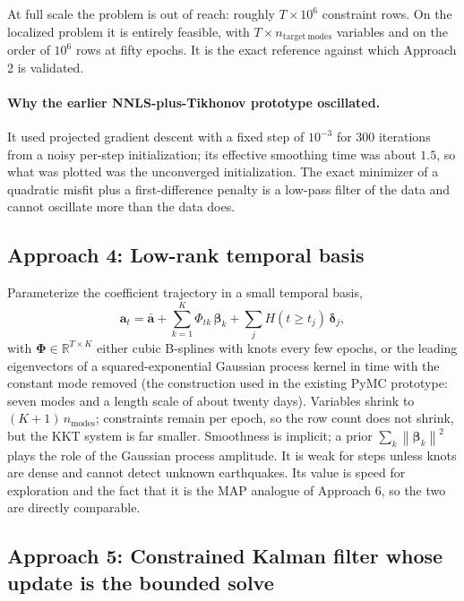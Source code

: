 \documentclass[11pt]{article}
\newcommand{\vect}[1]{\bm{#1}}
\newcommand{\mat}[1]{\mathbf{#1}}
\newcommand{\norm}[1]{\left\lVert #1 \right\rVert}
\begin{document}
At full scale the problem is out of reach: roughly $T \times 10^6$ constraint rows. On the localized problem it is entirely feasible, with $T \times n_{\mathrm{target\ modes}}$ variables and on the order of $10^6$ rows at fifty epochs. It is the exact reference against which Approach 2 is validated.

\paragraph{Why the earlier NNLS-plus-Tikhonov prototype oscillated.}
It used projected gradient descent with a fixed step of $10^{-3}$ for 300 iterations from a noisy per-step initialization; its effective smoothing time was about $1.5$, so what was plotted was the unconverged initialization. The exact minimizer of a quadratic misfit plus a first-difference penalty is a low-pass filter of the data and cannot oscillate more than the data does.

\subsection{Approach 4: Low-rank temporal basis}

Parameterize the coefficient trajectory in a small temporal basis,
\begin{equation}
\vect{a}_t = \bar{\vect{a}} + \sum_{k=1}^{K} \Phi_{tk}\,\vect{\beta}_k + \sum_j H(t \ge t_j)\,\vect{\delta}_j,
\end{equation}
with $\mat{\Phi} \in \mathbb{R}^{T \times K}$ either cubic B-splines with knots every few epochs, or the leading eigenvectors of a squared-exponential Gaussian process kernel in time with the constant mode removed (the construction used in the existing PyMC prototype: seven modes and a length scale of about twenty days). Variables shrink to $(K+1)\,n_{\mathrm{modes}}$; constraints remain per epoch, so the row count does not shrink, but the KKT system is far smaller. Smoothness is implicit; a prior $\sum_k \norm{\vect{\beta}_k}^2$ plays the role of the Gaussian process amplitude. It is weak for steps unless knots are dense and cannot detect unknown earthquakes. Its value is speed for exploration and the fact that it is the MAP analogue of Approach 6, so the two are directly comparable.

\subsection{Approach 5: Constrained Kalman filter whose update is the bounded solve}
\end{document}
